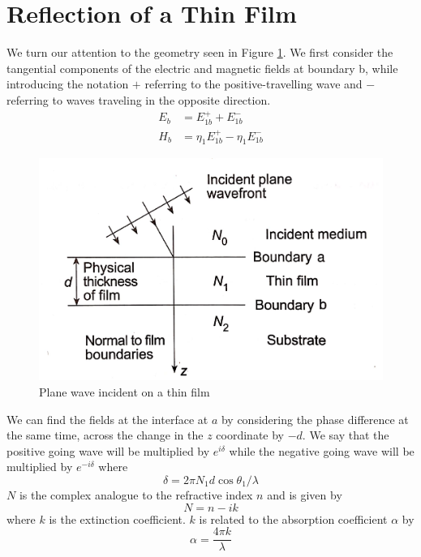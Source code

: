 \documentclass{article}
\begin{document}
\section{Reflection of a Thin Film}
    We turn our attention to the geometry seen in Figure \ref{fig:film}. We first consider the tangential components of the electric and magnetic fields at boundary b, while introducing the notation $+$ referring to the positive-travelling wave and $-$ referring to waves traveling in the opposite direction.
    \begin{align}
        E_b &= E_{1b}^+ + E_{1b}^- \\
        H_b &= \eta_1 E_{1b}^+ - \eta_1 E_{1b}^-    
    \end{align}
    \begin{figure}
        \includegraphics[width=\linewidth]{thin_film.png}
        \caption{Plane wave incident on a thin film}
        \label{fig:film}
    \end{figure}
    We can find the fields at the interface at $a$ by considering the phase difference at the same time, across the change in the $z$ coordinate by $-d$. We say that the positive going wave will be multiplied by $e^{i \delta}$ while the negative going wave will be multiplied by $e^{-i \delta}$ where
    \begin{equation}
        \delta = 2 \pi N_1 d \cos \theta_1 / \lambda    
    \end{equation}
    $N$ is the complex analogue to the refractive index $n$ and is given by $$N = n - ik $$ where $k$ is the extinction coefficient. $k$ is related to the absorption coefficient $\alpha$ by 
    \begin{equation}
        \alpha = \frac{4 \pi k}{\lambda}
    \end{equation}
    
\end{document}
